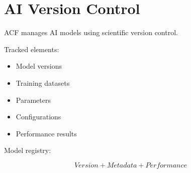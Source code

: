 \section{AI Version Control}


ACF manages AI models using scientific version control.



Tracked elements:


\begin{itemize}

\item Model versions

\item Training datasets

\item Parameters

\item Configurations

\item Performance results

\end{itemize}



Model registry:


\[
Version
+
Metadata
+
Performance
\]
